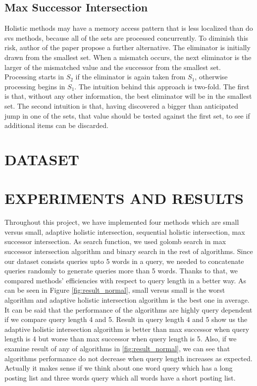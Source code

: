\documentclass[paper=a4, fontsize=11pt]{scrartcl} %
\numberwithin{equation}{section} %
\numberwithin{figure}{section} %
\numberwithin{table}{section} %
\begin{document}
\subsection{Max Successor Intersection}

Holistic methods may have a memory access pattern that is less localized than do svs methods, because all of the sets are processed concurrently. To diminish this risk, author of the paper propose a further alternative. The eliminator is initially drawn from the smallest set. When a mismatch occurs, the next eliminator is the larger of the mismatched value and the successor from the smallest set. Processing starts in $S_{2}$ if the eliminator is again taken from $S_{1}$, otherwise processing begins in $S_{1}$. The intuition behind this approach is two-fold. The first is that, without any other information, the best eliminator will be in the smallest set. The second intuition is that, having discovered a bigger than anticipated jump in one of the sets, that value should be tested against the first set, to see if additional items can be discarded.

\newpage
\section{DATASET}



\newpage
\section{EXPERIMENTS AND RESULTS}
Throughout this project, we have implemented four methods which are small versus small, adaptive holistic intersection, sequential holistic intersection, max successor intersection. As search function, we used golomb search in max successor intersection algorithm and binary search in the rest of algorithms. Since our dataset consists queries upto 5 words in a query,  we needed to concatenate queries randomly to generate queries more than 5 words. Thanks to that, we compared methods' efficiencies with respect to query length in a better way. As can be seen in Figure \ref{fig:result_normal}, small versus small is the worst algorithm and adaptive holistic intersection algorithm is the best one in average. It can be said that the performance of the algorithms are highly query dependent if we compare query length 4 and 5. Result in query length 4 and 5 show us the adaptive holistic intersection algorithm is better than max successor when query length is 4 but worse than max successor when query length is 5. Also, if we examine result of any of algorithms in \ref{fig:result_normal}, we can see that algorithms performance do not decrease when query length increases as expected. Actually it makes sense if we think about one word query which has a long posting list and three words query which all words have a short posting list.
 
\end{document}
